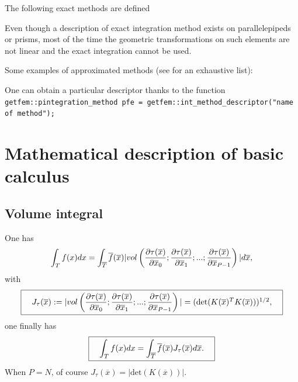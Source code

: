 \documentclass[11pt,a4paper]{article}
\begin{document}
The following exact methods are defined



Even though a description of exact integration method exists on parallelepipeds or prisms, most of the time the geometric transformations on such elements are not linear and the exact integration cannot be used.

Some examples of approximated methods (see \cite{FEM_LIST} for an exhaustive list):


One can obtain a particular descriptor thanks to the function\\[0.5cm]
{\tt getfem::pintegration\_method pfe = getfem::int\_method\_descriptor("name of method"); }\\[0.5cm]


\section{Mathematical description of basic calculus}

\subsection{Volume integral}
One has
$$ \int_T f(x) dx = \int_{\overline{T}} \overline{f}(\overline{x}) |vol\left({\displaystyle \frac{\displaystyle \partial \tau(\overline{x})}{\displaystyle \partial \overline{x}_0}} ;{\displaystyle \frac{\displaystyle \partial \tau(\overline{x})}{\displaystyle \partial \overline{x}_1}}; ...; {\displaystyle \frac{\displaystyle \partial \tau(\overline{x})}{\displaystyle \partial \overline{x}_{P-1} }}\right)| d\overline{x}, $$
with
$$ \fbox{$\hspace{1em} J_{\tau}(\overline{x}) := |vol\left({\displaystyle \frac{\displaystyle \partial \tau(\overline{x})}{\displaystyle \partial \overline{x}_0}} ;{\displaystyle \frac{\displaystyle \partial \tau(\overline{x})}{\displaystyle \partial \overline{x}_1}}; ...; {\displaystyle \frac{\displaystyle \partial \tau(\overline{x})}{\displaystyle \partial \overline{x}_{P-1} }}\right)| = (\mbox{det}(K(\overline{x})^T K(\overline{x})))^{1/2},\hspace{1em}$} $$
one finally has
$$ \fbox{$\hspace{1em} \displaystyle \int_T f(x) dx = \int_{\overline{T}} \overline{f}(\overline{x})  J_{\tau}(\overline{x})d\overline{x}.\hspace{1em}$} $$
When $P = N$, of course $J_{\tau}(\overline{x}) = |\mbox{det}(K(\overline{x}))|$.
\end{document}
